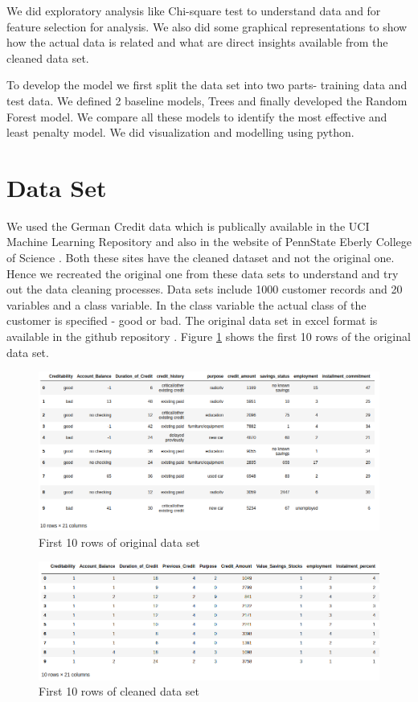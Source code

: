 \documentclass[sigconf]{acmart}
\begin{document}
We did exploratory analysis like Chi-square test to understand data and for feature selection for analysis. We also did some graphical representations to show how the actual data is related and what are direct insights available from the cleaned data set.

To develop the model we first split the data set into two parts- training data and test data. We defined 2 baseline models, Trees and finally developed the Random Forest model. We compare all these models to identify the most effective and least penalty model. We did visualization and modelling using python.

\section{Data Set}

We used the German Credit data which is publically available in the UCI Machine Learning Repository \cite{uci} and also in the website of PennState Eberly College of Science \cite{psu-site}. Both these sites have the cleaned dataset and not the original one. Hence we recreated the original one from these data sets to understand and try out the data cleaning processes. Data sets include 1000 customer records and 20 variables and a class variable. In the class variable the actual class of the customer is specified - good or bad. The original data set in excel format is available in the github repository \cite{github}. Figure \ref{fig:Figure1} shows the first 10 rows of the original data set.

\begin{figure}[htb]
  \centering
  \includegraphics[width=1.0\columnwidth]{project/images/Figure1.png}
  \caption{First 10 rows of original data set
  \cite{github}}
  \label{fig:Figure1} 
\end{figure}

\begin{figure}[htb]
  \centering
  \includegraphics[width=1.0\columnwidth]{project/images/Figure2.png}
  \caption{First 10 rows of cleaned data set
  \cite{psu-site}}
  \label{fig:Figure2} 
\end{figure}
\end{document}
